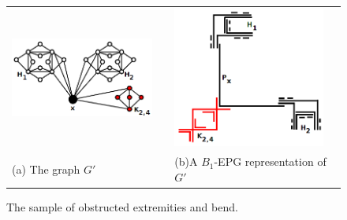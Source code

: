 \begin{figure}[h]
  \centering
  \begin{tabular}{p{6cm} p{0.5cm} p{6cm}}
     \includegraphics[width=5cm, center]{./img/grafoDobraExtremidadeObstruida2.png} &  &\includegraphics[width=5cm, center]{./img/extremidadeDobraObstruida4.png}  \\%
    \footnotesize \centering (a) The graph $G'$& & \footnotesize \centering (b)A $B_1$-EPG representation of $G'$%
  \end{tabular}
 \caption{The sample of  obstructed extremities and bend.}\label{fig:extremidadeDobraObstruida}
\end{figure}